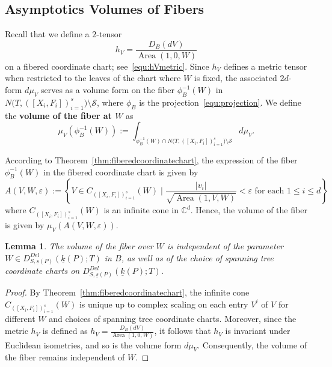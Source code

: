 \documentclass{compositio}
\numberwithin{equation}{section}
\numberwithin{figure}{section}
\theoremstyle{definition}
\theoremstyle{plain}
\newtheorem{lemma}[definition]{Lemma}
\begin{document}
{\subsection{Asymptotics Volumes of Fibers}

Recall that we define a $2$-tensor
$$
h_V = \frac{D_B(dV)}{\operatorname{Area}(1,0,W)}
$$
on a fibered coordinate chart; see~\eqref{equ:hVmetric}. Since $h_V$ defines a metric tensor when restricted to the leaves of the chart where $W$ is fixed, the associated $2d$-form $d\mu_V$ serves as a volume form on the fiber $\phi_B^{-1}(W)$ in $N\big(T, ([X_i, F_i])_{i=1}^s\big) \setminus \mathcal{S}$, where $\phi_B$ is the projection~\eqref{equ:projection}. We define the \textbf{volume of the fiber at $W$} as
$$
\mu_V\left(\phi_B^{-1}(W)\right) := \int_{\phi_B^{-1}(W)\cap N\big(T, ([X_i, F_i])_{i=1}^s\big) \setminus \mathcal{S}} d\mu_V.
$$

According to Theorem~\ref{thm:fiberedcoordinatechart}, the expression of the fiber $\phi_B^{-1}(W)$ in the fibered coordinate chart is given by
\begin{equation}\label{equ:volumefiberinfiberedcoordinatechart}
    A(V,W,\varepsilon) := \left\{V \in C_{([X_i, F_i])_{i=1}^s}(W) \mid \frac{|v_{i}|}{\sqrt{\operatorname{Area}(1, V, W)}} < \varepsilon \text{ for each } 1\le i\le d\right\}
\end{equation}
where $C_{([X_i, F_i])_{i=1}^s}(W)$ is an infinite cone in $\mathbb{C}^d$. Hence, the volume of the fiber is given by $\mu_V\left(A(V,W,\varepsilon)\right)$.

\begin{lemma}\label{lem:independentonWofthevolumeoffibers}
The volume of the fiber over $W$ is independent of the parameter $W \in D_{S,\underline{s}(P)}^{Del}(\underline{k}(P);T)$ in $B$, as well as of the choice of spanning tree coordinate charts on $D_{S,\underline{s}(P)}^{Del}(\underline{k}(P);T)$.    
\end{lemma}

\begin{proof}
By Theorem~\ref{thm:fiberedcoordinatechart}, the infinite cone $C_{([X_i, F_i])_{i=1}^s}(W)$ is unique up to complex scaling on each entry $V^i$ of $V$ for different $W$ and choices of spanning tree coordinate charts. Moreover, since the metric $h_V$ is defined as $h_V = \frac{D_B(dV)}{\operatorname{Area}(1,0,W)}$,
it follows that $h_V$ is invariant under Euclidean isometries, and so is the volume form $d\mu_V$. Consequently, the volume of the fiber remains independent of $W$.
\end{proof}

}
\end{document}
